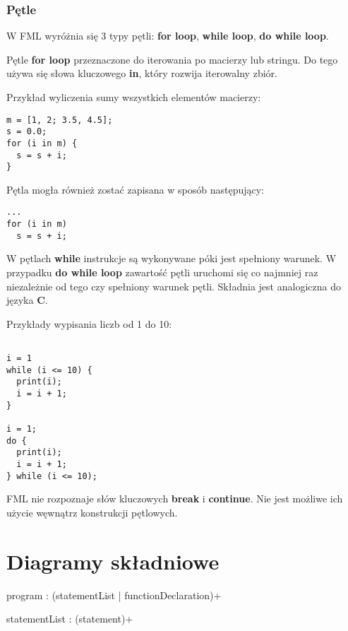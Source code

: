 \documentclass[12pt,a4paper]{article}
\begin{document}
\subsubsection{Pętle}

W FML wyróżnia się 3 typy pętli: \textbf{for loop}, \textbf{while loop}, \textbf{do while loop}.

\medskip

Pętle \textbf{for loop} przeznaczone do iterowania po macierzy lub stringu. Do tego używa się słowa kluczowego \textbf{in}, który rozwija iterowalny zbiór.

\medskip
Przykład wyliczenia sumy wszystkich elementów macierzy:

\begin{lstlisting}
m = [1, 2; 3.5, 4.5];
s = 0.0;
for (i in m) {
  s = s + i;
}
\end{lstlisting}

Pętla mogła również zostać zapisana w sposób następujący:
\begin{lstlisting}
...
for (i in m)
  s = s + i;
\end{lstlisting}

W pętlach \textbf{while} instrukcje są wykonywane póki jest spełniony warunek. W przypadku \textbf{do while loop} zawartość pętli uruchomi się co najmniej raz niezależnie od tego czy spełniony warunek pętli. Składnia jest analogiczna do języka \textbf{C}.

\medskip
Przykłady wypisania liczb od 1 do 10:

\begin{lstlisting}

i = 1
while (i <= 10) {
  print(i);
  i = i + 1;
}

i = 1;
do {
  print(i);
  i = i + 1;
} while (i <= 10);

\end{lstlisting}

FML nie rozpoznaje słów kluczowych \textbf{break} i \textbf{continue}. Nie jest możliwe ich użycie węwnątrz konstrukcji pętlowych.

\pagebreak

\section{Diagramy składniowe}

\begin{rail}
program : (statementList | functionDeclaration)+
\end{rail}

\begin{rail}
statementList : (statement)+ 
\end{rail}
\end{document}
